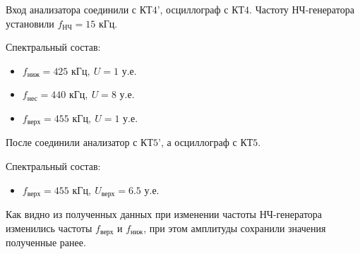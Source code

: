Вход анализатора соединили с $\text{КТ4'}$, осциллограф с $\text{КТ4}$. Частоту НЧ-генератора установили $f_{\text{НЧ}}=15 \text{ кГц.}$

Спектральный состав:
\begin{itemize}
	\item $f_{\text{ниж}}=425 \text{ кГц},~ U=1 \text{ у.е.}$
	\item $f_{\text{нес}}=440 \text{ кГц},~ U=8 \text{ у.е.}$
	\item $f_{\text{верх}}=455 \text{ кГц},~ U=1 \text{ у.е.}$
\end{itemize}

После соединили анализатор с $\text{КТ5'}$, а осциллограф с $\text{КТ5}$.

Спектральный состав:
\begin{itemize}
	\item $f_{\text{верх}}=455 \text{ кГц}, ~U_{\text{верх}}=6.5 \text{ у.е.}$
\end{itemize}

Как видно из полученных данных при изменении частоты НЧ-генератора изменились частоты $f_{\text{верх}}$ и $f_{\text{ниж}}$, при этом амплитуды сохранили значения полученные ранее.
